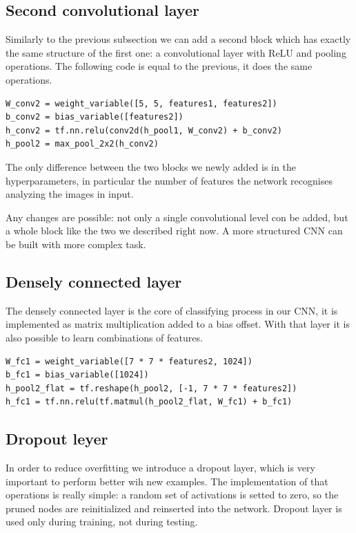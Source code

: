 \subsection{Second convolutional layer}

Similarly to the previous subsection we can add a second block which has exactly the same structure of the first one: a convolutional layer with ReLU and pooling operations. The following code is equal to the previous, it does the same operations.

\begin{lstlisting}
W_conv2 = weight_variable([5, 5, features1, features2])
b_conv2 = bias_variable([features2])
h_conv2 = tf.nn.relu(conv2d(h_pool1, W_conv2) + b_conv2)
h_pool2 = max_pool_2x2(h_conv2)
\end{lstlisting}

The only difference between the two blocks we newly added is in the hyperparameters, in particular the number of features the network recognises analyzing the images in input.

Any changes are possible: not only a single convolutional level con be added, but a whole block like the two we described right now. A more structured \acs{CNN} can be built with more complex task.

\subsection{Densely connected layer}

The densely connected layer is the core of classifying process in our \acs{CNN}, it is implemented as matrix multiplication added to a bias offset. With that layer it is also possible to learn combinations of features.

\begin{lstlisting}
W_fc1 = weight_variable([7 * 7 * features2, 1024])
b_fc1 = bias_variable([1024])
h_pool2_flat = tf.reshape(h_pool2, [-1, 7 * 7 * features2])
h_fc1 = tf.nn.relu(tf.matmul(h_pool2_flat, W_fc1) + b_fc1)
\end{lstlisting}

\subsection{Dropout leyer}

In order to reduce overfitting we introduce a dropout layer, which is very important to perform better wih new examples. The implementation of that operations is really simple: a random set of activations is setted to zero, so the pruned nodes are reinitialized and reinserted into the network. Dropout layer is used only during training, not during testing.

